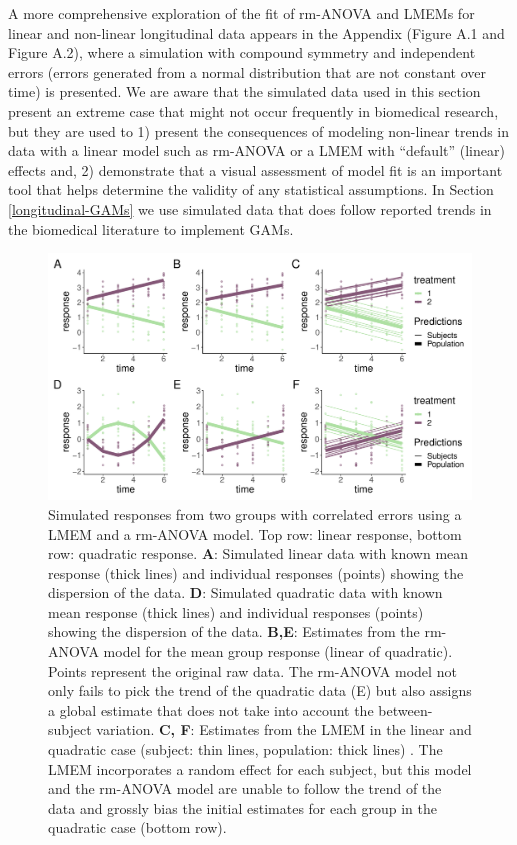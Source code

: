 \documentclass[
]{article}
\begin{document}
A more comprehensive exploration of the fit of rm-ANOVA and LMEMs for linear and non-linear longitudinal data appears in the Appendix (Figure A.1 and Figure A.2), where a simulation with compound symmetry and independent errors (errors generated from a normal distribution that are not constant over time) is presented. We are aware that the simulated data used in this section present an extreme case that might not occur frequently in biomedical research, but they are used to 1) present the consequences of modeling non-linear trends in data with a linear model such as rm-ANOVA or a LMEM with ``default'' (linear) effects and, 2) demonstrate that a visual assessment of model fit is an important tool that helps determine the validity of any statistical assumptions. In Section \ref{longitudinal-GAMs} we use simulated data that does follow reported trends in the biomedical literature to implement GAMs.



\begin{figure}

{\centering \includegraphics[width=1\linewidth]{Full_document_SIM_No_Appendix_files/figure-latex/l-q-response-1} 

}

\caption{Simulated responses from two groups with correlated errors using a LMEM and a rm-ANOVA model. Top row: linear response, bottom row: quadratic response. \textbf{A}: Simulated linear data with known mean response (thick lines) and individual responses (points) showing the dispersion of the data. \textbf{D}: Simulated quadratic data with known mean response (thick lines) and individual responses (points) showing the dispersion of the data. \textbf{B,E}: Estimates from the rm-ANOVA model for the mean group response (linear of quadratic). Points represent the original raw data. The rm-ANOVA model not only fails to pick the trend of the quadratic data (E) but also assigns a global estimate that does not take into account the between-subject variation. \textbf{C, F}: Estimates from the LMEM in the linear and quadratic case (subject: thin lines, population: thick lines) . The LMEM incorporates a random effect for each subject, but this model and the rm-ANOVA model are unable to follow the trend of the data and grossly bias the initial estimates for each group in the quadratic case (bottom row).}\label{fig:l-q-response}
\end{figure}
\end{document}
